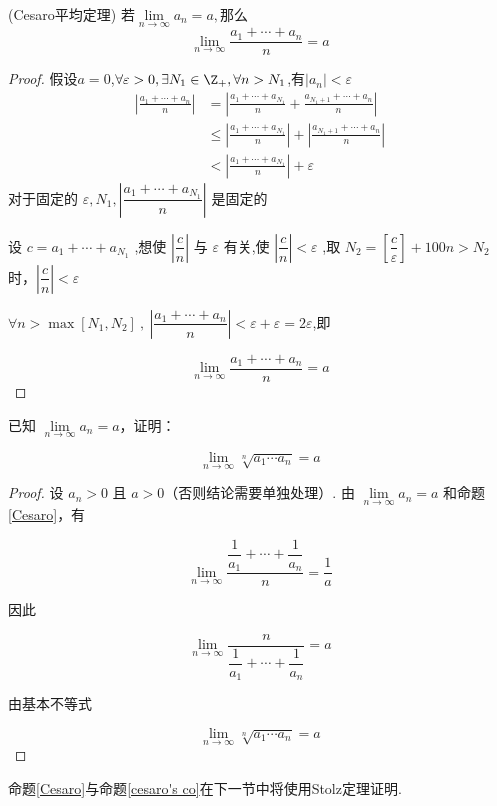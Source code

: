\begin{proposition}(Cesaro平均定理)
	若$\lim\limits_{n\to\infty}a_n=a,$那么
	$$\lim\limits_{n\to\infty}\frac{a_1+\cdots+a_n}{n}=a$$
	\label{Cesaro}
\end{proposition}
\begin{proof}
	假设$a=0$,$\forall\varepsilon>0,\exists N_1\in \Z_{+},\forall n>N_1$,有$|a_n|<\varepsilon$
	$$\begin{aligned}
		\left|\frac{a_1+\cdots+a_n}{n}\right| & =\left|\frac{a_1+\cdots+a_{N_1}}{n}+\frac{a_{N_1+1}+\cdots+a_n}{n}\right| \\
		& \leqslant\left|\frac{a_1+\cdots+a_{N_1}}{n}\right|+\left|\frac{a_{N_1+1}+\cdots+a_n}{n}\right| \\
		& <\left|\frac{a_1+\cdots+a_{N_1}}{n}\right|+\varepsilon
	\end{aligned}$$
	对于固定的 $\varepsilon, N_1,\left|\dfrac{a_1+\cdots+a_{N_1}}{n}\right|$ 是固定的
	
	设 $c=a_1+\cdots+a_{N_1}$ ,想使 $\left|\dfrac{c}{n}\right|$ 与 $\varepsilon$ 有关,使 $\left|\dfrac{c}{n}\right|<\varepsilon$ ,取 $N_2=\left[\dfrac{c}{\varepsilon}\right]+100 n>N_2$ 时，$\left|\dfrac{c}{n}\right|<\varepsilon$
	
	$\forall n>\max \left[N_1, N_2\right] ~,~\left|\dfrac{a_1+\cdots+a_n}{n}\right|<\varepsilon+\varepsilon=2 \varepsilon$,即
	
	
	$$\lim _{n \rightarrow \infty} \frac{a_{1}+\cdots+a_n}{n}=a$$
	
\end{proof}
\begin{corollary}
	已知 $\lim\limits_{n \to \infty} a_n = a$，证明：
	
	$$ \lim_{n \to \infty} \sqrt[n]{a_1 \cdots a_n} = a $$
	\label{cesaro's co}
\end{corollary}
\begin{proof}
	设 $a_n > 0$ 且 $a > 0$（否则结论需要单独处理）. 由 $\lim\limits_{n \to \infty} a_n = a$ 和命题\ref{Cesaro}，有
	
	$$ \lim_{n \to \infty} \dfrac{\dfrac{1}{a_1} + \cdots + \dfrac{1}{a_n}}{n} = \dfrac{1}{a} $$
	
	因此
	
	$$ \lim_{n \to \infty} \dfrac{n}{\dfrac{1}{a_1} + \cdots + \dfrac{1}{a_n}} = a $$
	
	由基本不等式
	
	$$ \lim_{n \to \infty} \sqrt[n]{a_1 \cdots a_n} = a $$
	
	
\end{proof}
命题\ref{Cesaro}与命题\ref{cesaro's co}在下一节中将使用Stolz定理证明.


